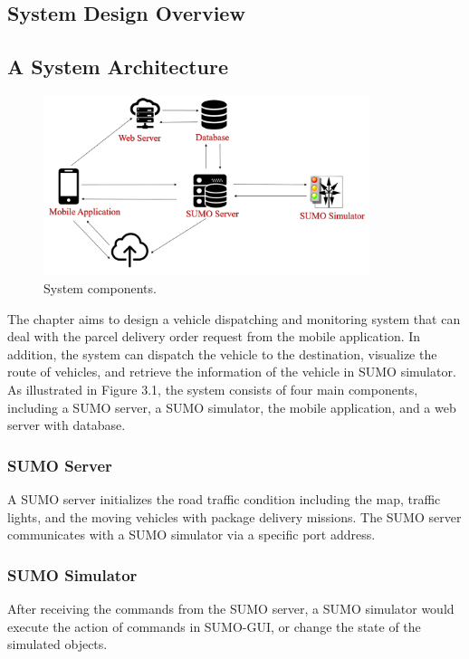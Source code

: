 \documentclass[12pt]{ksthesis}
\begin{document}
\begin{thesis}
{\chapter{System Design Overview}\label{Chap:Architecture}

\section{A System Architecture}

\begin{figure}[t!]
\centering
\includegraphics[width=0.85\textwidth]{./Thesis_figures/F3-1_a_whole_system.PNG}
\caption{\large System components.}
\vspace{0.5cm}
\label{Fig:A_Whole_System}
\end{figure}

The chapter aims to design a vehicle dispatching and monitoring system that can deal with the parcel delivery order request from the mobile application. In addition, the system can dispatch the vehicle to the destination, visualize the route of vehicles, and retrieve the information of the vehicle in SUMO simulator.
As illustrated in Figure 3.1, the system consists of four main components, including a SUMO server, a SUMO simulator, the mobile application, and a web server with database.

\subsection{SUMO Server}
A SUMO server initializes the road traffic condition including the map, traffic lights, and the moving vehicles with package delivery missions. The SUMO server communicates with a SUMO simulator via a specific port address.

\subsection{SUMO Simulator}
After receiving the commands from the SUMO server, a SUMO simulator would execute the action of commands in SUMO-GUI,  or change the state of the simulated objects.

}
\end{thesis}
\end{document}
